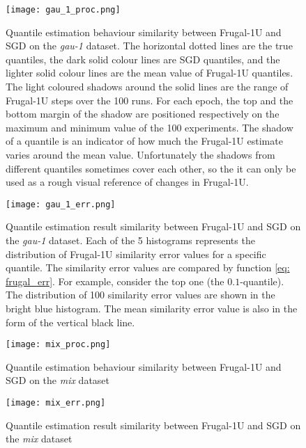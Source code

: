 
\begin{figure}[h!]
    \centering
    \texttt{[image: gau\_1\_proc.png]}
    \caption{Quantile estimation behaviour similarity between Frugal-1U and SGD on the \textit{gau-1} dataset. The horizontal dotted lines are the true quantiles, the dark solid colour lines are SGD quantiles, and the lighter solid colour lines are the mean value of Frugal-1U quantiles. The light coloured shadows around the solid lines are the range of Frugal-1U steps over the 100 runs. For each epoch, the top and the bottom margin of the shadow are positioned respectively on the maximum and minimum value of the 100 experiments. The shadow of a quantile is an indicator of how much the Frugal-1U estimate varies around the mean value. Unfortunately the shadows from different quantiles sometimes cover each other, so the it can only be used as a rough visual reference of changes in Frugal-1U.}
    \label{fig: gau_1_proc_explanation}
\end{figure}

\begin{figure}[h!]
    \centering
	\texttt{[image: gau\_1\_err.png]}
    \caption{Quantile estimation result similarity between Frugal-1U and SGD on the \textit{gau-1} dataset.
    Each of the 5 histograms represents the distribution of Frugal-1U similarity error values for a specific quantile. The similarity error values are compared by function \eqref{eq: frugal_err}. For example, consider the top one (the $0.1$-quantile). The distribution of 100 similarity error values are shown in the bright blue histogram. The mean similarity error value is also in the form of the vertical black line.}
    \label{fig: gau_1_err_explanation}
\end{figure}

\begin{figure}[h!]
    \centering
	\texttt{[image: mix\_proc.png]}
    \caption{Quantile estimation behaviour similarity between Frugal-1U and SGD on the \textit{mix} dataset}
    \label{fig: mix_proc}
\end{figure}

\begin{figure}[h!]
    \centering
	\texttt{[image: mix\_err.png]}
    \caption{Quantile estimation result similarity between Frugal-1U and SGD on the \textit{mix} dataset}
    \label{fig: mix_err}
\end{figure}

